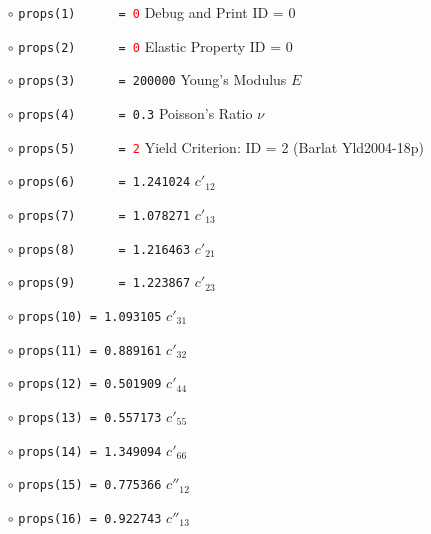 \documentclass[11pt,a4paper,twoside,final,onecolumn,titlepage]{article}
\begin{document}
\begin{itemize}
		\item[$\circ$] \texttt{props(1)\,\,\,\,\,\,= \textcolor{red}{0}} \hspace{100pt} Debug and Print ID = 0
		\item[$\circ$] \texttt{props(2)\,\,\,\,\,\,= \textcolor{red}{0}} \hspace{100pt} Elastic Property ID = 0
		\item[$\circ$] \texttt{props(3)\,\,\,\,\,\,= 200000} \hspace{72pt} Young’s Modulus $E$ 
		\item[$\circ$] \texttt{props(4)\,\,\,\,\,\,= 0.3} \hspace{89pt} Poisson’s Ratio $\nu$
		\item[$\circ$] \texttt{props(5)\,\,\,\,\,\,= \textcolor{red}{2}} \hspace{101pt} Yield Criterion: ID = 2 (Barlat Yld2004-18p)
		\item[$\circ$] \texttt{props(6)\,\,\,\,\,\,= 1.241024} \hspace{60pt} $c'_{12}$
		\item[$\circ$] \texttt{props(7)\,\,\,\,\,\,= 1.078271} \hspace{60pt} $c'_{13}$
		\item[$\circ$] \texttt{props(8)\,\,\,\,\,\,= 1.216463} \hspace{60pt} $c'_{21}$
		\item[$\circ$] \texttt{props(9)\,\,\,\,\,\,= 1.223867} \hspace{60pt} $c'_{23}$
		\item[$\circ$] \texttt{props(10) = 1.093105} \hspace{60pt} $c'_{31}$
		\item[$\circ$] \texttt{props(11) = 0.889161} \hspace{60pt} $c'_{32}$
		\item[$\circ$] \texttt{props(12) = 0.501909} \hspace{60pt} $c'_{44}$
		\item[$\circ$] \texttt{props(13) = 0.557173} \hspace{60pt} $c'_{55}$
		\item[$\circ$] \texttt{props(14) = 1.349094} \hspace{60pt} $c'_{66}$
		\item[$\circ$] \texttt{props(15) = 0.775366} \hspace{60pt} $c''_{12}$
		\item[$\circ$] \texttt{props(16) = 0.922743} \hspace{60pt} $c''_{13}$

\end{itemize}
\end{document}
